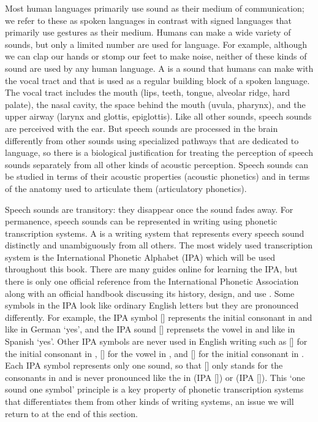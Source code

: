 Most human languages primarily use sound as their medium of communication; we refer to these as spoken languages in contrast with signed languages that primarily use gestures as their medium.
Humans can make a wide variety of sounds, but only a limited number are used for language.
For example, although we can clap our hands or stomp our feet to make noise, neither of these kinds of sound are used by any human language.
A  is a sound that humans can make with the vocal tract and that is used as a regular building block of a spoken language.
The vocal tract includes the mouth (lips, teeth, tongue, alveolar ridge, hard palate), the nasal cavity, the space behind the mouth (uvula, pharynx), and the upper airway (larynx and glottis, epiglottis).
Like all other sounds, speech sounds are perceived with the ear.
But speech sounds are processed in the brain differently from other sounds using specialized pathways that are dedicated to language, so there is a biological justification for treating the perception of speech sounds separately from all other kinds of acoustic perception.
Speech sounds can be studied in terms of their acoustic properties (acoustic phonetics) and in terms of the anatomy used to articulate them (articulatory phonetics).

Speech sounds are transitory: they disappear once the sound fades away.
For permanence, speech sounds can be represented in writing using phonetic transcription systems.
A  is a writing system that represents every speech sound distinctly and unambiguously from all others.
The most widely used transcription system is the International Phonetic Alphabet (IPA) which will be used throughout this book.
There are many guides online for learning the IPA, but there is only one official reference from the International Phonetic Association \parencite{international-phonetic-association:2018} along with an official handbook discussing its history, design, and use \parencite{international-phonetic-association:1999}.
Some symbols in the IPA look like ordinary English letters but they are pronounced differently.
For example, the IPA symbol [] represents the initial consonant in  and  like in German  ‘yes’, and the IPA sound [] reprensets the vowel in  and  like in Spanish  ‘yes’.
Other IPA symbols are never used in English writing such as [] for the initial consonant in , [] for the vowel in , and [] for the initial consonant in .
Each IPA symbol represents only one sound, so that [] only stands for the consonants in  and is never pronounced like the  in  (IPA []) or  (IPA []).
This ‘one sound one symbol’ principle is a key property of phonetic transcription systems that differentiates them from other kinds of writing systems, an issue we will return to at the end of this section.

